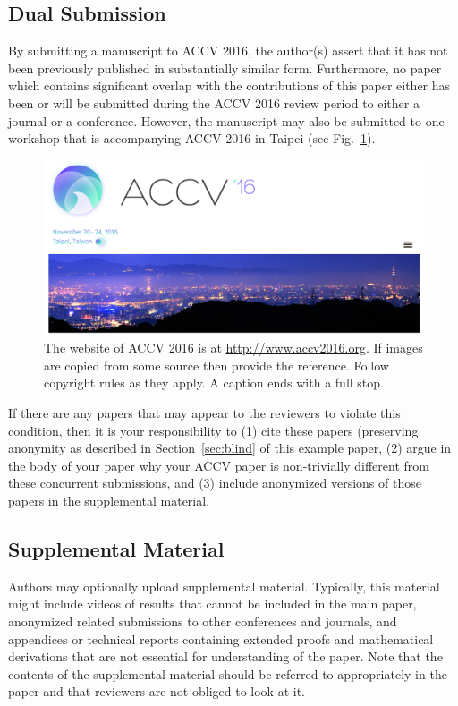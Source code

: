 \documentclass[runningheads]{llncs}
\begin{document}
\subsection{Dual Submission}

By submitting a manuscript to ACCV 2016, the author(s) assert that it has
not been previously published in substantially similar
form. Furthermore, no paper which contains significant overlap with
the contributions of this paper either has been or will be submitted
during the ACCV 2016 review period to either a journal or a
conference. However, the manuscript may also be submitted to
one workshop that is accompanying ACCV 2016 in Taipei (see Fig.~\ref{fig:ACCV16}).

\begin{figure}
\centering
\includegraphics[width=120mm]{accv16} 
\caption{
The website of ACCV 2016 is at \url{http://www.accv2016.org}. 
If images are copied from some source then provide the reference.
Follow copyright rules as they apply. A caption ends with a full stop.}
\label{fig:ACCV16}
\end{figure}

If there are any papers that may appear to the reviewers to violate
this condition, then it is your responsibility to (1) cite these
papers (preserving anonymity as described in Section~\ref{sec:blind}
of this example paper, (2) argue in the body of your paper why your
ACCV paper is non-trivially different from these concurrent
submissions, and (3) include anonymized versions of those papers in
the supplemental material.

\subsection{Supplemental Material} 

Authors may optionally upload supplemental material. Typically, this
material might include videos of results that cannot be included in
the main paper, anonymized related submissions to other conferences
and journals, and appendices or technical reports containing extended
proofs and mathematical derivations that are not essential for
understanding of the paper. Note that the contents of the supplemental
material should be referred to appropriately in the paper and that
reviewers are not obliged to look at it.
\end{document}
